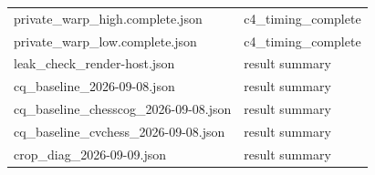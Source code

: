 \begin{longtable}{>{\raggedright\arraybackslash}p{.49\linewidth}>{\raggedright\arraybackslash}p{.44\linewidth}}
private\_\allowbreak{}warp\_\allowbreak{}high.complete.json & %
c4\_\allowbreak{}timing\_\allowbreak{}complete \\ %

private\_\allowbreak{}warp\_\allowbreak{}low.complete.json & %
c4\_\allowbreak{}timing\_\allowbreak{}complete \\ %

leak\_\allowbreak{}check\_\allowbreak{}render-host.json & %
result summary \\ %

cq\_\allowbreak{}baseline\_\allowbreak{}2026-09-08.json & %
result summary \\ %

cq\_\allowbreak{}baseline\_\allowbreak{}chesscog\_\allowbreak{}2026-09-08.json & %
result summary \\ %

cq\_\allowbreak{}baseline\_\allowbreak{}cvchess\_\allowbreak{}2026-09-08.json & %
result summary \\ %

crop\_\allowbreak{}diag\_\allowbreak{}2026-09-09.json & %
result summary \\ %


\end{longtable}
